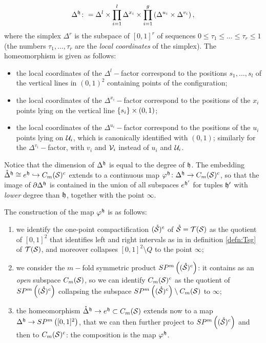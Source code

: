 \[
 \Delta^{\mathfrak{h}}\colon =
 \Delta^l\times\prod_{i=1}^l\Delta^{x_i}\times\prod_{i=1}^g\left(\Delta^{u_i}\times\Delta^{v_i}\right),
\]
where the simplex $\Delta^r$ is the subspace of $[0,1]^r$ of sequences $0\leq \tau_1\leq\dots\leq\tau_r\leq 1$
(the numbers $\tau_1,\dots,\tau_r$ are the \emph{local coordinates} of the simplex). The homeomorphism is given
as follows:
\begin{itemize}
 \item the local coordinates of the $\Delta^l-$factor correspond to the positions $s_1,\dots,s_l$ of the vertical
 lines in $(0,1)^2$ containing points of the configuration;
 \item the local coordinates of the $\Delta^{x_i}-$factor correspond to the positions of the $x_i$ points
 lying on the vertical line $\left\{s_i\right\}\times(0,1)$;
 \item the local coordinates of the $\Delta^{u_i}-$factor correspond to the positions of the $u_i$ points
 lying on $\mathcal{U}_i$, which is canonically identified with $(0,1)$; similarly for the $\Delta^{v_i}-$factor,
 with $v_i$ and $\mathcal{V}_i$ instead of $u_i$ and $\mathcal{U}_i$.
\end{itemize}
Notice that the dimension of $\Delta^{\mathfrak{h}}$ is equal to the degree of $\mathfrak{h}$.
The embedding $\mathring{\Delta}^{\mathfrak{h}}\cong e^{\mathfrak{h}}\hookrightarrow C_m(\mathcal{S})^c$ extends to a continuous map
$\varphi^{\mathfrak{h}}\colon\Delta^{\mathfrak{h}}\to C_m(\mathcal{S})^c$, so that the image of $\partial\Delta^{\mathfrak{h}}$ is contained in the union of
all subspaces $e^{\mathfrak{h}'}$ for tuples $\mathfrak{h}'$ with \emph{lower} degree than $\mathfrak{h}$, together with the point $\infty$.

The construction of the map $\varphi^{\mathfrak{h}}$ is as follows:
\begin{enumerate}
\item we identify the one-point compactification
$(\mathring{\mathcal{S}})^c$ of $\mathring{\mathcal{S}}=\mathcal{T}(\mathcal{S})$ as the quotient of $[0,1]^2$ that identifies left and right intervals as in
in definition \ref{defn:Tsg} of $\mathcal{T}(\mathcal{S})$, and moreover collapses $[0,1]^2\setminus Q$ to the point $\infty$;
\item we consider the $m-$fold symmetric product $SP^m\left((\mathring{\mathcal{S}})^c\right)$: it contains 
as an \emph{open} subspace $C_m(\mathcal{S})$, so we can identify $C_m(\mathcal{S})^c$ as the quotient of $SP^m\left((\mathring{\mathcal{S}})^c\right)$ collapsing
the subspace $SP^m\left((\mathring{\mathcal{S}})^c\right)\setminus C_m(\mathcal{S})$ to $\infty$;
\item the homeomorphism $\mathring{\Delta}^{\mathfrak{h}}\to e^{\mathfrak{h}}\subset C_m(\mathcal{S})$ extends
now to a map $\Delta^{\mathfrak{h}}\to SP^m\left([0,1]^2\right)$, that we can then further project to
$ SP^m\left((\mathring{\mathcal{S}})^c\right)$ and then to $C_m(\mathcal{S})^c$: the composition
is the map $\varphi^{\mathfrak{h}}$.
\end{enumerate}


